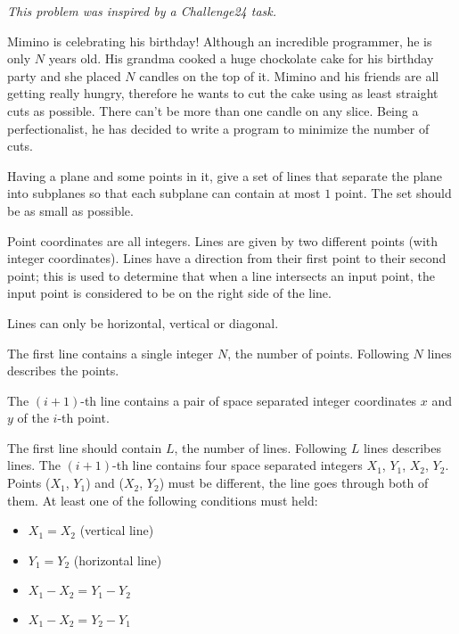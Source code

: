 





{\it This problem was inspired by a Challenge24 task.}

\bigskip

Mimino is celebrating his birthday! Although an incredible programmer, he is only $N$ years old. His grandma cooked a huge chockolate cake for his birthday party and she placed $N$ candles on the top of it. Mimino and his friends are all getting really hungry, therefore he wants to cut the cake using as least straight cuts as possible. There can't be more than one candle on any slice. Being a perfectionalist, he has decided to write a program to minimize the number of cuts.


Having a plane and some points in it, give a set of lines that separate the plane into subplanes so that each subplane can contain at most $1$ point. The set should be as small as possible.

Point coordinates are all integers. Lines are given by two different points (with integer coordinates). Lines have a direction from their first point to their second point; this is used to determine that when a line intersects an input point, the input point is considered to be on the right side of the line.

Lines can only be horizontal, vertical or diagonal.


The first line contains a single integer $N$, the number of points.
Following $N$ lines describes the points.

The $(i+1)$-th line contains a pair of space separated integer coordinates $x$ and $y$ of the $i$-th point.


The first line should contain $L$, the number of lines.
Following $L$ lines describes lines.
The $(i+1)$-th line contains four space separated integers $X_1$, $Y_1$, $X_2$, $Y_2$. Points ($X_1$, $Y_1$) and ($X_2$, $Y_2$) must be different, the line goes through both of them. At least one of the following conditions must held:

\begin{itemize}
  \item $X_1 = X_2$ (vertical line)
  \item $Y_1 = Y_2$ (horizontal line)
  \item $X_1 - X_2 = Y_1 - Y_2$
  \item $X_1 - X_2 = Y_2 - Y_1$
\end{itemize}

